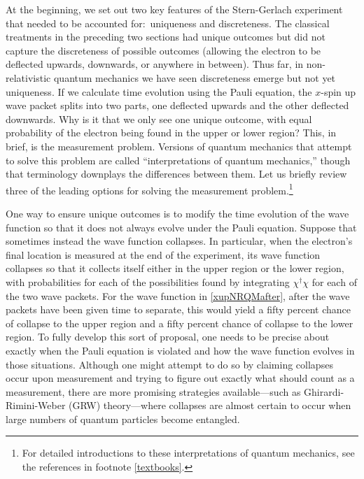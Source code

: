 \documentclass[onecolumn,secnumarabic,amsmath,amssymb,balancelastpage,nofootinbib]{article}
\begin{document}
At the beginning, we set out two key features of the Stern-Gerlach experiment that needed to be accounted for:\ uniqueness and discreteness.  The classical treatments in the preceding two sections had unique outcomes but did not capture the discreteness of possible outcomes (allowing the electron to be deflected upwards, downwards, or anywhere in between).  Thus far, in non-relativistic quantum mechanics we have seen discreteness emerge but not yet uniqueness.  If we calculate time evolution using the Pauli equation, the $x$-spin up wave packet splits into two parts, one deflected upwards and the other deflected downwards.  Why is it that we only see one unique outcome, with equal probability of the electron being found in the upper or lower region?  This, in brief, is the measurement problem.  Versions of quantum mechanics that attempt to solve this problem are called ``interpretations of quantum mechanics,'' though that terminology downplays the differences between them.  Let us briefly review three of the leading options for solving the measurement problem.\footnote{For detailed introductions to these interpretations of quantum mechanics, see the references in footnote \ref{textbooks}.}

One way to ensure unique outcomes is to modify the time evolution of the wave function so that it does not always evolve under the Pauli equation.  Suppose that sometimes instead the wave function collapses.  In particular, when the electron's final location is measured at the end of the experiment, its wave function collapses so that it collects itself either in the upper region or the lower region, with probabilities for each of the possibilities found by integrating $\chi^{\dagger}\chi$ for each of the two wave packets.  For the wave function in \eqref{xupNRQMafter}, after the wave packets have been given time to separate, this would yield a fifty percent chance of collapse to the upper region and a fifty percent chance of collapse to the lower region.  To fully develop this sort of proposal, one needs to be precise about exactly when the Pauli equation is violated and how the wave function evolves in those situations.  Although one might attempt to do so by claiming collapses occur upon measurement and trying to figure out exactly what should count as a measurement, there are more promising strategies available---such as Ghirardi-Rimini-Weber (GRW) theory---where collapses are almost certain to occur when large numbers of quantum particles become entangled.
\end{document}
